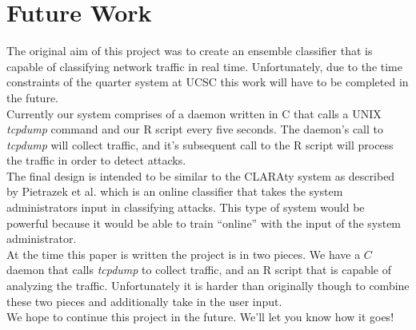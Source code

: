 \documentclass[12pt]{article} %
\begin{document}
\section{Future Work}
The original aim of this project was to create an ensemble classifier that is capable of classifying network traffic in real time. Unfortunately, due to the time constraints of the quarter system at UCSC this work will have to be completed in the future.\\
Currently our system comprises of a daemon written in C that calls a UNIX \textit{tcpdump} command and our R script every five seconds. The daemon's call to \textit{tcpdump} will collect traffic, and it's subsequent call to the R script will process the traffic in order to detect attacks.\\
The final design is intended to be similar to the CLARAty system as described by Pietrazek et al. \cite{pietraszek05} which is an online classifier that takes the system administrators input in classifying attacks. This type of system would be powerful because it would be able to train ``online'' with the input of the system administrator.\\
At the time this paper is written the project is in two pieces. We have a $C$ daemon that calls \textit{tcpdump} to collect traffic, and an R script that is capable of analyzing the traffic. Unfortunately it is harder than originally though to combine these two pieces and additionally take in the user input.\\
We hope to continue this project in the future. We'll let you know how it goes!\\
\end{document}
